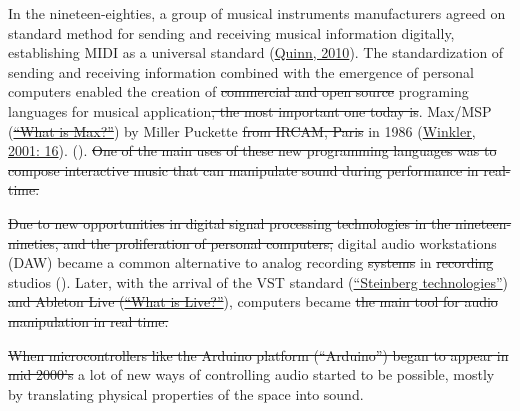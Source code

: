 In the nineteen-eighties, a group of musical instruments manufacturers agreed on standard method for sending and receiving musical information digitally, establishing MIDI  as a universal standard (\href{http://www.insidetechnology360.com/index.php/the-history-of-midi-8862/}{Quinn, 2010}). The standardization of sending and receiving information combined with the emergence of personal computers enabled the creation of \st{commercial and open source}  programing languages for musical application\st{, the most important one today is}. Max/MSP (\href{http://cycling74.com/whatismax/}{\st{``What is Max?''}})  by Miller Puckette \st{from IRCAM, Paris} in 1986  (\href{http://blog.lib.umn.edu/geers001/emusic/14_assig_ComposingInteractiveMusicCh1-2.pdf}{Winkler, 2001: 16}).  ().\st{ One of the main uses of these new programming languages was to compose interactive music that can manipulate sound during performance in real-time.}

 \st{Due to new opportunities in digital signal processing technologies in the nineteen-nineties, and the proliferation of personal computers,} digital audio workstations (DAW) became a common alternative to analog recording  \st{systems} in \st{recording} studios (). Later, with the arrival of the VST standard (\href{http://www.steinberg.net/en/company/technologies.html}{``Steinberg technologies''}) \st{and Ableton Live (}\href{https://www.ableton.com/en/live/}{\st{``What is Live?''}}), computers became  \st{the main tool for audio manipulation in real time.} \href{https://www.ableton.com/en/live/}{} 

\st{When microcontrollers like the Arduino platform (``Arduino'') began to appear in mid 2000's} a lot of new ways of controlling audio started to be possible, mostly by translating physical properties of the space into sound.

